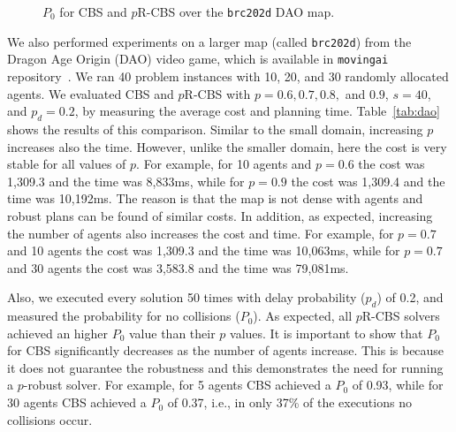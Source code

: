 \documentclass{article}
\newcommand{\prcbs}{$p$R-CBS\xspace}
\begin{document}
\begin{figure}[t]
	\centering
	\caption{$P_0$ for CBS and \prcbs{} over the {\tt brc202d} DAO map.}
	\label{fig:brc_p0}
\end{figure}
\fi


We also performed experiments on a larger map (called {\tt brc202d}) from the Dragon Age Origin (DAO) video game, which is available in {\tt movingai} repository~\cite{sturtevant2012benchmarks}.
We ran 40 problem instances with 10, 20, and 30 randomly allocated agents. We evaluated CBS and \prcbs{} with $p=0.6,0.7,0.8,$ and $0.9$, $s=40$, and $p_d=0.2$, by measuring the average  cost and planning time. Table~\ref{tab:dao} shows the results of this comparison. Similar to the small domain, increasing $p$ increases also the time. However, unlike the smaller domain, here the cost is very stable for all values of $p$. For example, for 10 agents and $p=0.6$ the cost was 1,309.3 and the time was 8,833ms, while for $p=0.9$ the cost was 1,309.4 and the time was 10,192ms. The reason is that the map is not dense with agents and robust plans can be found of similar costs. In addition, as expected, increasing the number of agents also increases the cost and time. For example, for $p=0.7$ and 10 agents the cost was 1,309.3 and the time was 10,063ms, while for $p=0.7$ and 30 agents the cost was 3,583.8 and the time was 79,081ms.  

Also, we executed every solution 50 times with delay probability ($p_d$) of 0.2, and measured the probability for no collisions ($P_0$).  As expected, all \prcbs{} solvers achieved an higher $P_0$ value than their $p$ values. It is important to show that  $P_0$ for CBS significantly decreases as the number of agents increase. This is because it does not guarantee the robustness and this demonstrates the need for running a $p$-robust solver.  For example, for 5 agents CBS achieved a $P_0$ of 0.93, while for 30 agents CBS achieved a $P_0$ of 0.37, i.e., in only 37\% of the executions no collisions occur.
\end{document}
